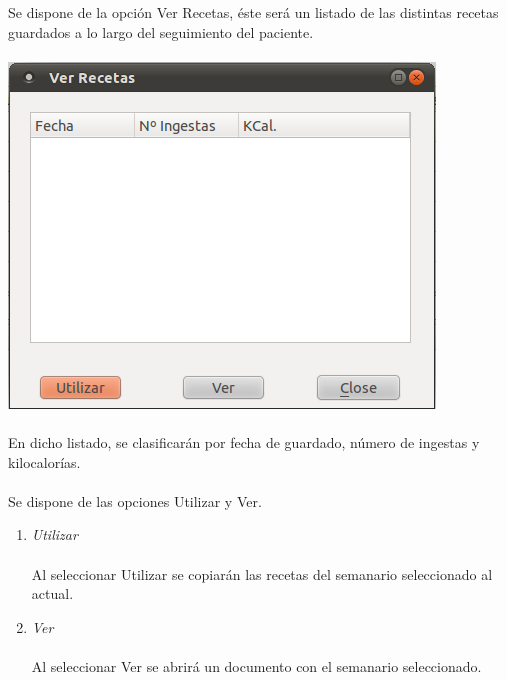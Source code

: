 \documentclass[12pt, spanish]{article}
\begin{document}
Se dispone de la opción Ver Recetas, éste será un listado de las distintas recetas guardados a lo largo del seguimiento del paciente.\\\\
\includegraphics[scale=0.5]{Image/verrecetas.png}\\\\
En dicho listado, se clasificarán por fecha de guardado, número de ingestas y kilocalorías.\\\\
Se dispone de las opciones Utilizar y Ver.
\begin{enumerate}
\item \textit{Utilizar}\\\\
Al seleccionar Utilizar se copiarán las recetas del semanario seleccionado al actual.\\
\item \textit{Ver}\\\\
Al seleccionar Ver se abrirá un documento con el semanario seleccionado.\\
\end{enumerate}

\newpage







\end{document}
